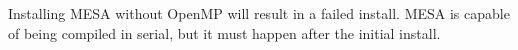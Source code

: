\begin{enumerate}
Installing {\sf MESA} without OpenMP will result in a 
failed install. {\sf MESA} is capable of being compiled in serial, but it 
must happen after the initial install.

%


\end{enumerate}

